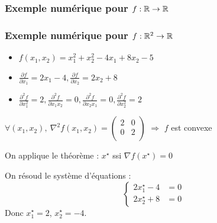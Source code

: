 \documentclass{beamer}
\newcommand{\R}{{\ensuremath\mathbb{R}}}
\begin{document}
\begin{frame}
  \frametitle{Exemple numérique pour $f:\R \rightarrow \R$}

  
\end{frame}

\begin{frame}
  \frametitle{Exemple numérique pour $f:\R^2 \rightarrow \R$}

  \begin{itemize}
  \item $f(x_1,x_2) = x_1^2 + x_2^2 - 4x_1 + 8x_2 - 5$
  \item $\frac{\partial f}{\partial x_1} = 2x_1 - 4, \frac{\partial f}{\partial x_2} = 2x_2 + 8$
  \item $
    \frac{\partial^2 f}{\partial x_1^2} = 2,
    \frac{\partial^2 f}{\partial x_1x_2} = 0,
    \frac{\partial^2 f}{\partial x_2x_1} = 0,
    \frac{\partial^2 f}{\partial x_2^2} = 2
    $
  \end{itemize}

  
  $\forall (x_1,x_2), \ \nabla^2f(x_1,x_2) =
  \left(\begin{array}{cc}
    2 & 0 \\
    0 & 2 \\
  \end{array}
  \right)
  $ $\Rightarrow$ $f$ est convexe
  
  On applique le théorème : $x^\star$ ssi ${\nabla f}(x^\star) = 0$

  On résoud le système d'équations : 
  \[
  \left\{
  \begin{array}{ll}
    2x^\star_1 - 4 & = 0\\
    2x^\star_2 + 8 & = 0
  \end{array}
  \right.
  \]
  Donc $x^\star_1 = 2$, $x^\star_2 = -4$.
  
\end{frame}
\end{document}
